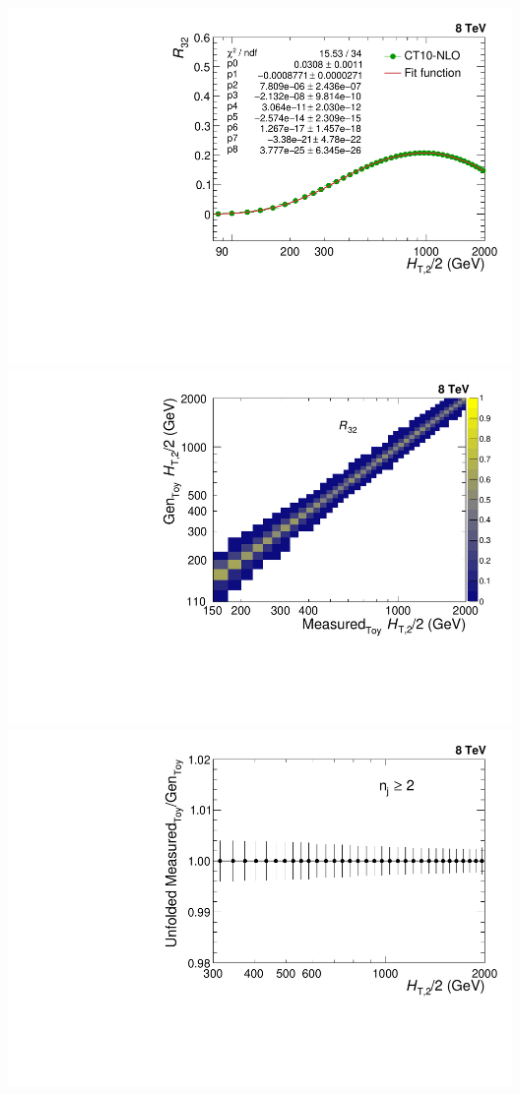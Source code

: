 \documentclass{beamer}
\begin{document}
\begin{frame}
\begin{minipage}[tbp]{0.15\textwidth}
\includegraphics[scale = 0.16]{Plots_HT_2_150/Extrapolate_Theory_Ratio_32_funcII.pdf}%
\includegraphics[scale = 0.16]{Plots_HT_2_150/Normalized_Response_Matrix_NLO_ratio_32_column_3.pdf}\\
\includegraphics[scale = 0.16]{Plots_HT_2_150/Ratio_Unfolding_NLO_2_funcI.pdf}%

\end{minipage}
\end{frame}
\end{document}
